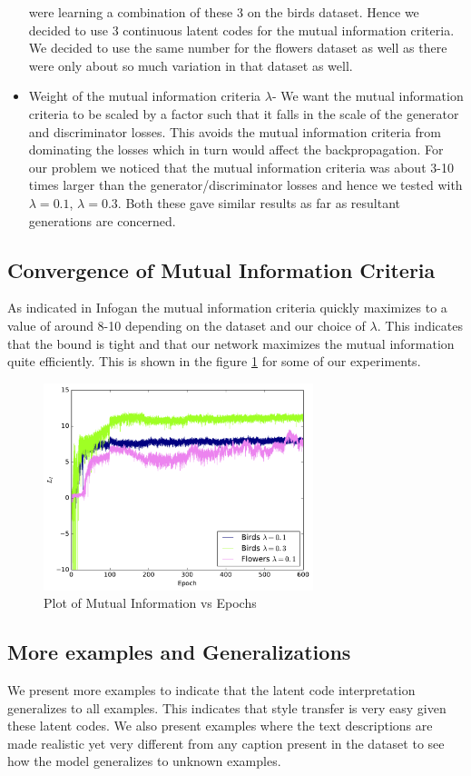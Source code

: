 \documentclass{article}
\begin{document}
\begin{itemize}
were learning a
        combination of these 3 on the birds dataset. Hence we decided to use 3
        continuous latent codes for the mutual information criteria. We decided
        to use the same number for the flowers dataset as well as there were
        only about so much variation in that dataset as well.
    \item Weight of the mutual information criteria $\lambda$- We want the
        mutual information criteria to be scaled by a factor such that it falls
        in the scale of the generator and discriminator losses. This avoids the
        mutual information criteria from dominating the losses which in turn
        would affect the backpropagation. For our problem we noticed that the
        mutual information criteria was about 3-10 times larger than the
        generator/discriminator losses and hence we tested with $\lambda = 0.1$,
        $\lambda = 0.3$. Both these gave similar results as far as resultant
        generations are concerned.
\end{itemize}

\subsection{Convergence of Mutual Information Criteria}
As indicated in Infogan \cite{infogan} the mutual information criteria quickly maximizes to
a value of around 8-10 depending on the dataset and our choice of $\lambda$.
This indicates that the bound is tight and that our network maximizes the mutual
information quite efficiently. This is shown in the figure \ref{fig:miplot} for some of our
experiments.
\begin{figure}
\centering
\includegraphics[width=0.7\textwidth]{miplot}
\caption{Plot of Mutual Information vs Epochs}
\label{fig:miplot}
\end{figure}
\subsection{More examples and Generalizations}
We present more examples to indicate that the latent code interpretation
generalizes to all examples. This indicates that style transfer is very easy
given these latent codes. We also present examples where the text descriptions
are made realistic yet very different from any caption present in the dataset to
see how the model generalizes to unknown examples.
\end{document}
